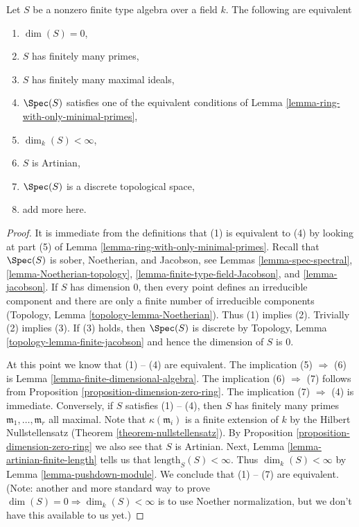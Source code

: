 \begin{lemma}
\label{lemma-finite-type-algebra-finite-nr-primes}
Let $S$ be a nonzero finite type algebra over a field $k$.
The following are equivalent
\begin{enumerate}
\item $\dim(S) = 0$,
\item $S$ has finitely many primes,
\item $S$ has finitely many maximal ideals,
\item $\Spec(S)$ satisfies one of the equivalent conditions of
Lemma \ref{lemma-ring-with-only-minimal-primes},
\item $\dim_k(S) < \infty$,
\item $S$ is Artinian,
\item $\Spec(S)$ is a discrete topological space,
\item add more here.
\end{enumerate}
\end{lemma}

\begin{proof}
It is immediate from the definitions that (1) is equivalent to (4)
by looking at part (5) of Lemma \ref{lemma-ring-with-only-minimal-primes}.
Recall that $\Spec(S)$ is sober, Noetherian, and Jacobson, see
Lemmas \ref{lemma-spec-spectral}, \ref{lemma-Noetherian-topology},
\ref{lemma-finite-type-field-Jacobson}, and \ref{lemma-jacobson}.
If $S$ has dimension $0$, then every point defines an
irreducible component and there are only a finite number
of irreducible components (Topology, Lemma \ref{topology-lemma-Noetherian}).
Thus (1) implies (2). Trivially (2) implies (3).
If (3) holds, then $\Spec(S)$ is discrete by
Topology, Lemma \ref{topology-lemma-finite-jacobson}
and hence the dimension of $S$ is $0$.

\medskip\noindent
At this point we know that (1) -- (4) are equivalent.
The implication (5) $\Rightarrow$ (6) is
Lemma \ref{lemma-finite-dimensional-algebra}.
The implication (6) $\Rightarrow$ (7) follows from
Proposition \ref{proposition-dimension-zero-ring}.
The implication (7) $\Rightarrow$ (4) is immediate.
Conversely, if $S$ satisfies (1) -- (4), then $S$ has finitely
many primes $\mathfrak m_1, \ldots, \mathfrak m_r$ all maximal.
Note that $\kappa(\mathfrak m_i)$ is a finite extension of $k$ by the
Hilbert Nullstellensatz (Theorem \ref{theorem-nullstellensatz}).
By Proposition \ref{proposition-dimension-zero-ring} we also see
that $S$ is Artinian. Next, Lemma \ref{lemma-artinian-finite-length}
tells us that $\text{length}_S(S) < \infty$. Thus $\dim_k(S) < \infty$ by
Lemma \ref{lemma-pushdown-module}. We conclude that
(1) -- (7) are equivalent. (Note: another and more standard
way to prove $\dim(S) = 0 \Rightarrow \dim_k(S) < \infty$
is to use Noether normalization, but we don't have this available to us yet.)
\end{proof}

